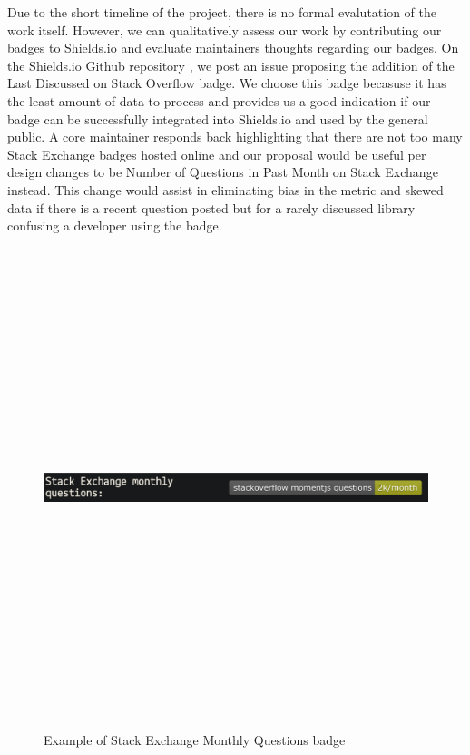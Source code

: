 \documentclass[12pt, letterpaper]{article}
\begin{document}
Due to the short timeline of the project, there is no formal evalutation of the work itself.
However, we can qualitatively assess our work by contributing our badges to Shields.io \cite{shields}
and evaluate maintainers thoughts regarding our badges. On the Shields.io Github repository \cite{shieldsrepo}, 
we post an issue \cite{shieldsissue} proposing the addition of the Last Discussed on Stack Overflow badge.
We choose this badge becasuse it has the least amount of data to process and provides us a good indication
if our badge can be successfully integrated into Shields.io \cite{shields} and used by the general public.
A core maintainer responds back highlighting that there are not too many Stack Exchange badges hosted online
and our proposal would be
useful per design changes to be Number of Questions in Past Month on Stack Exchange instead. 
This change would assist in eliminating bias in the metric and skewed data if there is a recent question posted but
for a rarely discussed library confusing a developer using the badge.


\begin{figure}[!htb]
    \centerline{
        \includegraphics[width=14cm,height=14cm,keepaspectratio=true]{semonthlybadge}
    }
    \caption{
        Example of Stack Exchange Monthly Questions badge
    }
    \label{semonthlybadge}
\end{figure}
\end{document}

